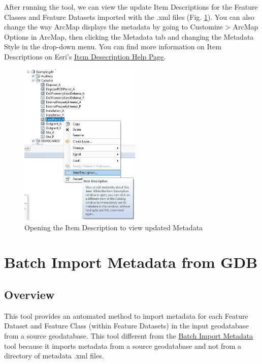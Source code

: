 \documentclass[openany]{book}
\theoremstyle{definition}
\theoremstyle{definition}
\theoremstyle{definition}
\theoremstyle{remark}
\begin{document}
After running the tool, we can view the update Item Descriptions for the
Feature Classes and Feature Datasets imported with the .xml files (Fig.
\ref{fig:imMetaafter}). You can also change the way ArcMap displays the
metadata by going to Customize \textgreater{} ArcMap Options in ArcMap,
then clicking the Metadata tab and changing the Metadata Style in the
drop-down menu. You can find more information on Item Descriptions on
Esri's
\href{http://desktop.arcgis.com/en/arcmap/latest/map/working-with-arcmap/documenting-items-in-the-catalog-window.htm}{Item
Desecription Help Page}.

\begin{figure}[H]

{\centering \includegraphics[width=2.27in,]{figures/imMeta-after} 

}

\caption{Opening the Item Description to view updated Metadata}\label{fig:imMetaafter}
\end{figure}

\hypertarget{imMetaGDB}{\chapter{Batch Import Metadata from
GDB}\label{imMetaGDB}}

\section{Overview}\label{overview-12}

This tool provides an automated method to import metadata for each
Feature Dataset and Feature Class (within Feature Datasets) in the input
geodatabase from a source geodatabase. This tool different from the
\protect\hyperlink{imMeta}{Batch Import Metadata} tool because it
imports metadata from a source geodatabase and not from a directory of
metadata .xml files.
\end{document}

